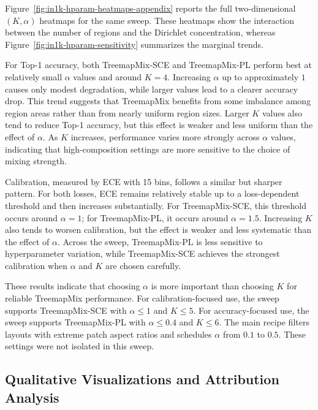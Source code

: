 

Figure~\ref{fig:in1k-hparam-heatmaps-appendix} reports the full
two-dimensional $(K,\alpha)$ heatmaps for the same sweep. These heatmaps show
the interaction between the number of regions and the Dirichlet concentration,
whereas Figure~\ref{fig:in1k-hparam-sensitivity} summarizes the marginal
trends.



For Top-1 accuracy, both TreemapMix-SCE and TreemapMix-PL perform best at
relatively small $\alpha$ values and around $K=4$. Increasing $\alpha$ up to
approximately $1$ causes only modest degradation, while larger values lead to a
clearer accuracy drop. This trend suggests that TreemapMix benefits from some
imbalance among region areas rather than from nearly uniform region sizes.
Larger $K$ values also tend to reduce Top-1 accuracy, but this effect is
weaker and less uniform than the effect of $\alpha$. As $K$ increases,
performance varies more strongly across $\alpha$ values, indicating that
high-composition settings are more sensitive to the choice of mixing strength.

Calibration, measured by ECE with 15 bins, follows a similar but sharper
pattern. For both losses, ECE remains relatively stable up to a loss-dependent
threshold and then increases substantially. For TreemapMix-SCE, this threshold
occurs around $\alpha=1$; for TreemapMix-PL, it occurs around $\alpha=1.5$.
Increasing $K$ also tends to worsen calibration, but the effect is weaker and
less systematic than the effect of $\alpha$. Across the sweep, TreemapMix-PL
is less sensitive to hyperparameter variation, while TreemapMix-SCE achieves
the strongest calibration when $\alpha$ and $K$ are chosen carefully.

These results indicate that choosing $\alpha$ is more important than choosing
$K$ for reliable TreemapMix performance. For calibration-focused use, the
sweep supports TreemapMix-SCE with $\alpha \le 1$ and $K \le 5$. For
accuracy-focused use, the sweep supports TreemapMix-PL with $\alpha \le 0.4$
and $K \le 6$. The main recipe filters layouts with extreme patch aspect ratios and schedules
$\alpha$ from $0.1$ to $0.5$. These settings were not isolated in this sweep.

\subsection{Qualitative Visualizations and Attribution Analysis}
\label{app:qualitative-visualizations}

